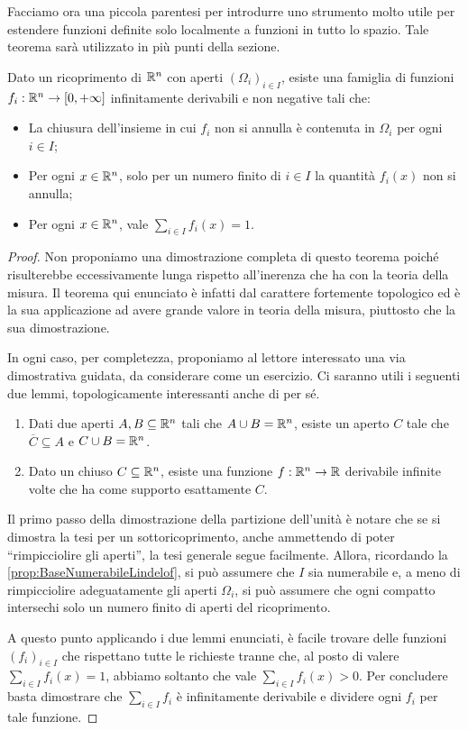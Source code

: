 Facciamo ora una piccola parentesi per introdurre uno strumento molto utile per estendere funzioni definite solo localmente a funzioni in tutto lo spazio. Tale teorema sarà utilizzato in più punti della sezione.

\begin{theorem}\label{thm:PartizioneUnita}
	Dato un ricoprimento di $\mathbb R^n$ con aperti $(\Omega_i)_{i\in I}$, esiste una famiglia di funzioni $f_i:\mathbb R^n\to[0,+\infty]$ infinitamente derivabili
	e non negative tali che:
	\begin{itemize}
		\item La chiusura dell'insieme in cui $f_i$ non si annulla è contenuta in $\Omega_i$ per ogni $i\in I$;
		\item Per ogni $x\in\mathbb R^n$, solo per un numero finito di $i\in I$ la quantità $f_i(x)$ non si annulla;
		\item Per ogni $x\in\mathbb R^n$, vale $\sum_{i\in I} f_i(x)=1$.
	\end{itemize}
\end{theorem}
\begin{proof}
	Non proponiamo una dimostrazione completa di questo teorema poiché risulterebbe eccessivamente lunga rispetto all'inerenza che ha con la teoria della misura. Il teorema qui enunciato è infatti dal carattere fortemente topologico ed è la sua applicazione ad avere grande valore in teoria della misura, piuttosto che la sua dimostrazione.
	
	In ogni caso, per completezza, proponiamo al lettore interessato una via dimostrativa guidata, da considerare come un esercizio.
	Ci saranno utili i seguenti due lemmi, topologicamente interessanti anche di per sé.
	\begin{enumerate}
		\item Dati due aperti $A,B\subseteq \mathbb R^n$ tali che $A\cup B=\mathbb R^n$, esiste un aperto $C$ tale che $\overline{C}\subseteq A$ e $C\cup B=\mathbb R^n$.
		\item Dato un chiuso $C\subseteq \mathbb R^n$, esiste una funzione $f:\mathbb R^n\to\mathbb R$ derivabile infinite volte che ha come supporto esattamente $C$.
	\end{enumerate}
	
	Il primo passo della dimostrazione della partizione dell'unità è notare che se si dimostra la tesi per un sottoricoprimento, anche ammettendo di poter ``rimpicciolire gli aperti'', la tesi generale segue facilmente. 
	Allora, ricordando la \cref{prop:BaseNumerabileLindelof}, si può assumere che $I$ sia numerabile e, a meno di rimpicciolire adeguatamente gli aperti $\Omega_i$, si può assumere che ogni compatto intersechi solo un numero finito di aperti del ricoprimento.
	
	A questo punto applicando i due lemmi enunciati, è facile trovare delle funzioni $(f_i)_{i\in I}$ che rispettano tutte le richieste tranne che, al posto di valere $\sum_{i\in I} f_i(x)=1$, abbiamo soltanto che vale $\sum_{i\in I} f_i(x)>0$.
	Per concludere basta dimostrare che $\sum_{i\in I}f_i$ è infinitamente derivabile e dividere ogni $f_i$ per tale funzione.
\end{proof}

